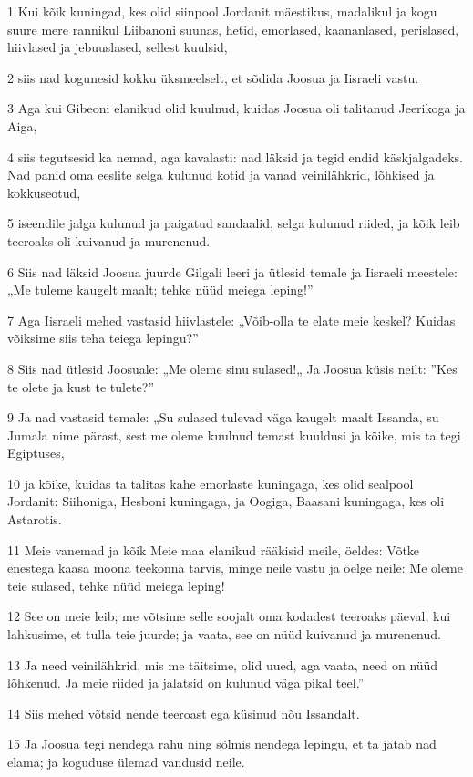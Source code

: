 \par 1 Kui kõik kuningad, kes olid siinpool Jordanit mäestikus, madalikul ja kogu suure mere rannikul Liibanoni suunas, hetid, emorlased, kaananlased, perislased, hiivlased ja jebuuslased, sellest kuulsid,
\par 2 siis nad kogunesid kokku üksmeelselt, et sõdida Joosua ja Iisraeli vastu.
\par 3 Aga kui Gibeoni elanikud olid kuulnud, kuidas Joosua oli talitanud Jeerikoga ja Aiga,
\par 4 siis tegutsesid ka nemad, aga kavalasti: nad läksid ja tegid endid käskjalgadeks. Nad panid oma eeslite selga kulunud kotid ja vanad veinilähkrid, lõhkised ja kokkuseotud,
\par 5 iseendile jalga kulunud ja paigatud sandaalid, selga kulunud riided, ja kõik leib teeroaks oli kuivanud ja murenenud.
\par 6 Siis nad läksid Joosua juurde Gilgali leeri ja ütlesid temale ja Iisraeli meestele: „Me tuleme kaugelt maalt; tehke nüüd meiega leping!”
\par 7 Aga Iisraeli mehed vastasid hiivlastele: „Võib-olla te elate meie keskel? Kuidas võiksime siis teha teiega lepingu?”
\par 8 Siis nad ütlesid Joosuale: „Me oleme sinu sulased!„ Ja Joosua küsis neilt: ”Kes te olete ja kust te tulete?”
\par 9 Ja nad vastasid temale: „Su sulased tulevad väga kaugelt maalt Issanda, su Jumala nime pärast, sest me oleme kuulnud temast kuuldusi ja kõike, mis ta tegi Egiptuses,
\par 10 ja kõike, kuidas ta talitas kahe emorlaste kuningaga, kes olid sealpool Jordanit: Siihoniga, Hesboni kuningaga, ja Oogiga, Baasani kuningaga, kes oli Astarotis.
\par 11 Meie vanemad ja kõik Meie maa elanikud rääkisid meile, öeldes: Võtke enestega kaasa moona teekonna tarvis, minge neile vastu ja öelge neile: Me oleme teie sulased, tehke nüüd meiega leping!
\par 12 See on meie leib; me võtsime selle soojalt oma kodadest teeroaks päeval, kui lahkusime, et tulla teie juurde; ja vaata, see on nüüd kuivanud ja murenenud.
\par 13 Ja need veinilähkrid, mis me täitsime, olid uued, aga vaata, need on nüüd lõhkenud. Ja meie riided ja jalatsid on kulunud väga pikal teel.”
\par 14 Siis mehed võtsid nende teeroast ega küsinud nõu Issandalt.
\par 15 Ja Joosua tegi nendega rahu ning sõlmis nendega lepingu, et ta jätab nad elama; ja koguduse ülemad vandusid neile.
